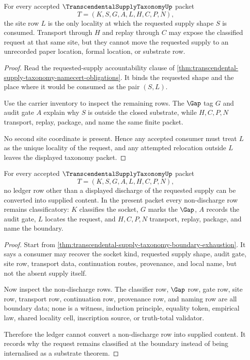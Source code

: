 \begin{theorem}
\label{thm:transcendental-supply-taxonomy-site-locality}
For every accepted $\TranscendentalSupplyTaxonomyUp$ packet
$$
T=(K,S,G,A,L,H,C,P,N),
$$
the site row $L$ is the only locality at which the requested supply shape $S$ is consumed. Transport through $H$ and replay through $C$ may expose the classified request at that same site, but they cannot move the requested supply to an unrecorded paper location, formal location, or substrate row.
\end{theorem}
\begin{proof}
Read the requested-supply accountability clause of \autoref{thm:transcendental-supply-taxonomy-namecert-obligations}. It binds the requested shape and the place where it would be consumed as the pair $(S,L)$.

Use the carrier inventory to inspect the remaining rows. The $\Gap$ tag $G$ and audit gate $A$ explain why $S$ is outside the closed substrate, while $H,C,P,N$ transport, replay, package, and name the same finite packet.

No second site coordinate is present. Hence any accepted consumer must treat $L$ as the unique locality of the request, and any attempted relocation outside $L$ leaves the displayed taxonomy packet.
\end{proof}

\begin{theorem}
\label{thm:transcendental-supply-taxonomy-nondischarge-ledger}
For every accepted $\TranscendentalSupplyTaxonomyUp$ packet
$$
T=(K,S,G,A,L,H,C,P,N),
$$
no ledger row other than a displayed discharge of the requested supply can be converted into supplied content. In the present packet every non-discharge row remains classificatory: $K$ classifies the socket, $G$ marks the $\Gap$, $A$ records the audit gate, $L$ locates the request, and $H,C,P,N$ transport, replay, package, and name the boundary.
\end{theorem}
\begin{proof}
Start from \autoref{thm:transcendental-supply-taxonomy-boundary-exhaustion}. It says a consumer may recover the socket kind, requested supply shape, audit gate, site row, transport data, continuation routes, provenance, and local name, but not the absent supply itself.

Now inspect the non-discharge rows. The classifier row, $\Gap$ row, gate row, site row, transport row, continuation row, provenance row, and naming row are all boundary data; none is a witness, induction principle, equality token, empirical law, shared locality cell, inscription source, or truth-total validator.

Therefore the ledger cannot convert a non-discharge row into supplied content. It records why the request remains classified at the boundary instead of being internalised as a substrate theorem.
\end{proof}

